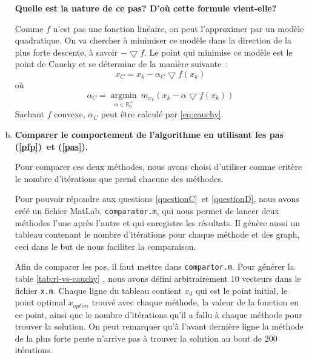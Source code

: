 \documentclass[11pt,a4paper,twoside,onecolumn,titlepage]{report}
\newcommand{\question}[1]{\textbf{#1}}
\begin{document}
\begin{enumerate}[(a)]
\question{Quelle est la nature de ce pas? D'où cette formule vient-elle?}

%
%



   
Comme $f$ n'est pas une fonction linéaire, on peut l'approximer par un modèle quadratique.
On va chercher à minimiser ce modèle dans la direction de la plus forte descente, à savoir $-\bigtriangledown f$. Le point qui minimise ce modèle est le point de Cauchy et se détermine de la manière suivante~:
\begin{equation}
x_C = x_k - \alpha_C \bigtriangledown f(x_k)
\end{equation}
où
\begin{equation}
\alpha_C = \underset{\alpha \in \mathbb{R}^+_0}{\operatorname{argmin}}\ m_{x_k}(x_k-\alpha\bigtriangledown f(x_k))
\end{equation}
Sachant $f$ convexe, $\alpha_C$ peut être calculé par \eqref{eq:cauchy}.




%
%
%

\item\label{questionC} \question{Comparer le comportement de l'algorithme en utilisant les pas (\ref{pfp})\ et (\ref{pas}).}

%
%
Pour comparer ces deux méthodes, nous avons choisi d'utiliser comme critère le nombre d'itérations que prend chacune des méthodes. 

Pour pouvoir répondre aux questions \ref{questionC}\ et \ref{questionD}, nous avons créé un fichier MatLab, \texttt{comparator.m}, qui nous permet de lancer deux méthodes l'une après l'autre et qui enregistre les résultats. Il génère aussi un tableau contenant le nombre d'itérations pour chaque méthode et des graph, ceci dans le but de nous faciliter la comparaison.

Afin de comparer les pas, il faut mettre  dans \texttt{compartor.m}. Pour générer la table \ref{tab:rl-vs-cauchy} , nous avons défini arbitrairement 10 vecteurs  dans le fichier \texttt{x.m}. Chaque ligne du tableau contient $x_0$ qui est le point initial, le point optimal $x_{optim}$ trouvé avec chaque méthode, la valeur de la fonction en ce point, ainsi que le nombre d'itérations qu'il a fallu à chaque méthode pour trouver la solution. On peut remarquer qu'à l'avant dernière ligne la méthode de la plus forte pente n'arrive pas à trouver la solution au bout de 200 itérations.


\end{enumerate}
\end{document}
